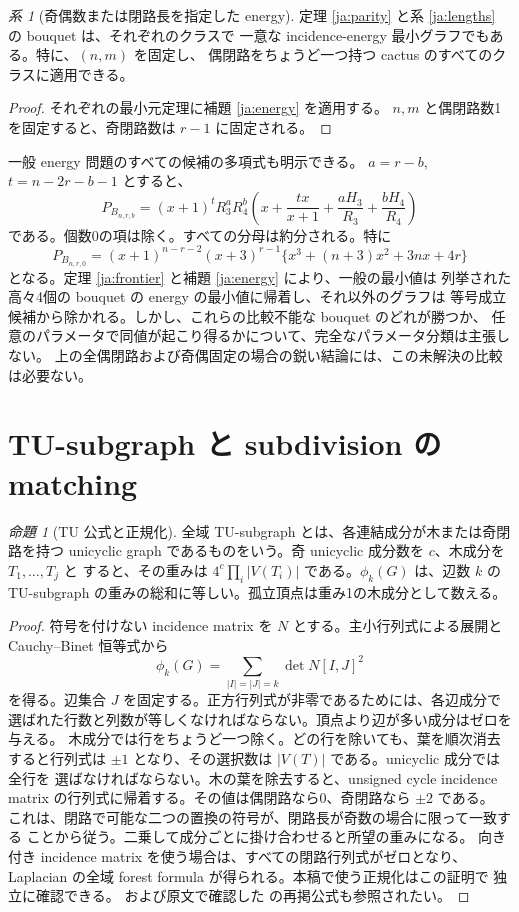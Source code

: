 \documentclass[12pt]{amsart}
\theoremstyle{definition}
\theoremstyle{remark}
\numberwithin{equation}{section}
\newtheorem{jprop}[thm]{命題}
\newtheorem{jcor}[thm]{系}
\begin{document}
\begin{jcor}[奇偶数または閉路長を指定した energy]\label{ja:fixedenergy}
定理 \ref{ja:parity} と系 \ref{ja:lengths} の bouquet は、それぞれのクラスで
一意な incidence-energy 最小グラフでもある。特に、$(n,m)$ を固定し、
偶閉路をちょうど一つ持つ cactus のすべてのクラスに適用できる。
\end{jcor}
\begin{proof}
それぞれの最小元定理に補題 \ref{ja:energy} を適用する。
$n,m$ と偶閉路数1を固定すると、奇閉路数は $r-1$ に固定される。
\end{proof}

一般 energy 問題のすべての候補の多項式も明示できる。
$a=r-b$, $t=n-2r-b-1$ とすると、
\begin{equation}\label{ja:generalP}
 P_{B_{n,r,b}}=
 (x+1)^tR_3^aR_4^b
 \left(x+\frac{tx}{x+1}+\frac{aH_3}{R_3}
                        +\frac{bH_4}{R_4}\right)
\end{equation}
である。個数0の項は除く。すべての分母は約分される。特に
\[
 P_{B_{n,r,0}}=(x+1)^{n-r-2}(x+3)^{r-1}
             \{x^3+(n+3)x^2+3nx+4r\}
\]
となる。定理 \ref{ja:frontier} と補題 \ref{ja:energy} により、一般の最小値は
列挙された高々4個の bouquet の energy の最小値に帰着し、それ以外のグラフは
等号成立候補から除かれる。しかし、これらの比較不能な bouquet のどれが勝つか、
任意のパラメータで同値が起こり得るかについて、完全なパラメータ分類は主張しない。
上の全偶閉路および奇偶固定の場合の鋭い結論には、この未解決の比較は必要ない。

\section{TU-subgraph と subdivision の matching}
\begin{jprop}[TU 公式と正規化]\label{ja:TU}
全域 TU-subgraph とは、各連結成分が木または奇閉路を持つ unicyclic graph
であるものをいう。奇 unicyclic 成分数を $c$、木成分を $T_1,\ldots,T_j$ と
すると、その重みは $4^c\prod_i|V(T_i)|$ である。$\phi_k(G)$ は、辺数 $k$ の
TU-subgraph の重みの総和に等しい。孤立頂点は重み1の木成分として数える。
\end{jprop}
\begin{proof}
符号を付けない incidence matrix を $N$ とする。主小行列式による展開と
Cauchy--Binet 恒等式から
\[
 \phi_k(G)=\sum_{|I|=|J|=k}\det N[I,J]^2
\]
を得る。辺集合 $J$ を固定する。正方行列式が非零であるためには、各辺成分で
選ばれた行数と列数が等しくなければならない。頂点より辺が多い成分はゼロを与える。
木成分では行をちょうど一つ除く。どの行を除いても、葉を順次消去すると行列式は
$\pm1$ となり、その選択数は $|V(T)|$ である。unicyclic 成分では全行を
選ばなければならない。木の葉を除去すると、unsigned cycle incidence matrix
の行列式に帰着する。その値は偶閉路なら0、奇閉路なら $\pm2$ である。
これは、閉路で可能な二つの置換の符号が、閉路長が奇数の場合に限って一致する
ことから従う。二乗して成分ごとに掛け合わせると所望の重みになる。
向き付き incidence matrix を使う場合は、すべての閉路行列式がゼロとなり、
Laplacian の全域 forest formula が得られる。本稿で使う正規化はこの証明で
独立に確認できる。\cite{ja-crs} および原文で確認した
\cite[Lemma 2.1, p.~4217]{ja-zw} の再掲公式も参照されたい。
\end{proof}
\end{document}
